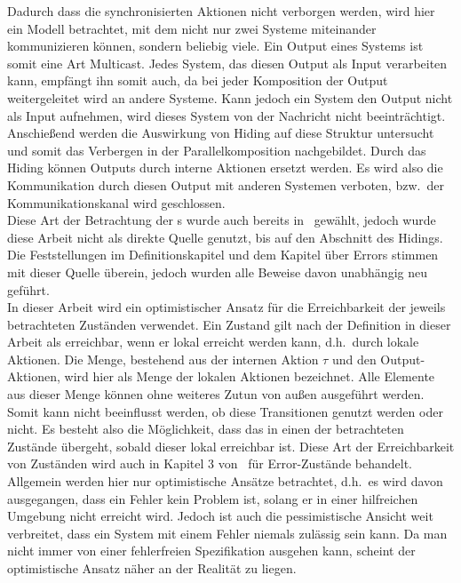 Dadurch dass die synchronisierten Aktionen nicht verborgen werden, wird hier
ein Modell betrachtet, mit dem nicht nur zwei Systeme miteinander kommunizieren können,
sondern beliebig viele. Ein Output eines Systems ist somit eine Art Multicast.
Jedes System, das diesen Output als Input verarbeiten kann, empfängt ihn somit auch,
da bei jeder Komposition der Output weitergeleitet wird an andere Systeme.
Kann jedoch ein System den Output nicht als Input aufnehmen, wird dieses System von
der Nachricht nicht beeinträchtigt.\\
Anschießend werden die Auswirkung von Hiding auf diese Struktur
untersucht und somit das Verbergen in der Parallelkomposition nachgebildet.
Durch das Hiding können Outputs durch interne Aktionen ersetzt werden. Es wird
also die Kommunikation durch diesen Output mit anderen Systemen verboten, bzw.\
der Kommunikationskanal wird geschlossen.\\
Diese Art der Betrachtung der
\EIO{}s wurde auch bereits in~\cite{Schlosser2012BA} gewählt, jedoch wurde
diese Arbeit nicht als direkte Quelle genutzt, bis auf den Abschnitt des
Hidings. Die Feststellungen im Definitionskapitel und dem Kapitel über
Errors stimmen mit dieser Quelle überein, jedoch wurden alle Beweise davon unabhängig neu
geführt.\\
In dieser Arbeit wird ein optimistischer Ansatz für die Erreichbarkeit
der jeweils betrachteten Zuständen verwendet. Ein Zustand gilt nach der Definition in dieser
Arbeit als erreichbar, wenn er lokal erreicht
werden kann, d.h.\ durch lokale Aktionen. Die Menge, bestehend aus der internen
Aktion $\tau$ und den Output-Aktionen, wird hier als Menge der lokalen Aktionen
bezeichnet.
Alle Elemente aus dieser Menge können ohne weiteres Zutun von außen ausgeführt
werden. Somit kann nicht beeinflusst werden, ob diese Transitionen genutzt
werden oder nicht. Es besteht also die Möglichkeit, dass das \EIO{} in einen
der betrachteten Zustände übergeht, sobald dieser lokal erreichbar ist. Diese Art der
Erreichbarkeit von Zuständen wird auch in Kapitel 3 von~\cite{Vogler2014EIO}
für Error-Zustände behandelt.\\
Allgemein werden hier nur optimistische Ansätze betrachtet, d.h.\ es wird davon
ausgegangen, dass ein Fehler kein Problem ist, solang er in einer hilfreichen
Umgebung nicht erreicht wird. Jedoch ist auch die pessimistische Ansicht weit
verbreitet, dass ein System mit einem Fehler niemals zulässig sein kann. Da man
nicht immer von einer fehlerfreien Spezifikation ausgehen kann, scheint der
optimistische Ansatz näher an der Realität zu liegen.\\
